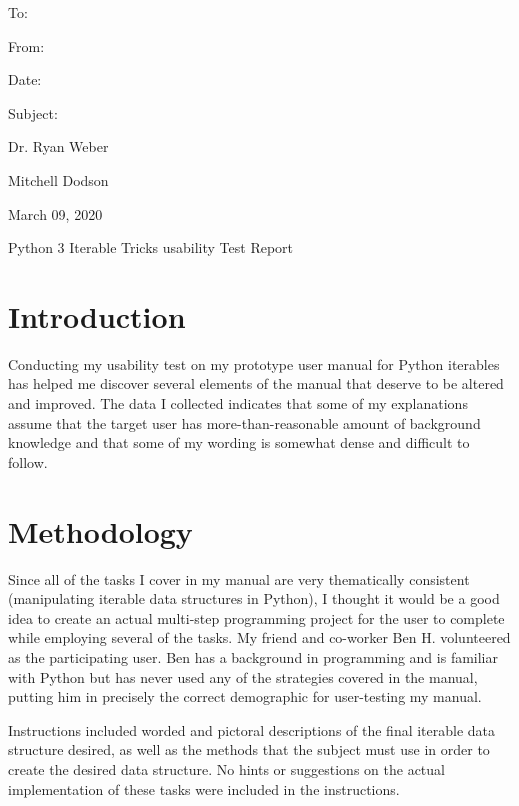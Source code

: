 \documentclass[11pt]{article}
\begin{document}
\begin{minipage}[h]{.1\textwidth}
	To:

	From:

	Date:

	Subject:
\end{minipage}
\begin{minipage}[h]{.8\textwidth}

	Dr. Ryan Weber

	Mitchell Dodson

	March 09, 2020

	Python 3 Iterable Tricks usability Test Report
\end{minipage}

\section{Introduction}

Conducting my usability test on my prototype user manual for Python iterables has helped me discover several elements of the manual that deserve to be altered and improved. The data I collected indicates that some of my explanations assume that the target user has more-than-reasonable amount of background knowledge and that some of my wording is somewhat dense and difficult to follow.

\section{Methodology}

Since all of the tasks I cover in my manual are very thematically consistent (manipulating iterable data structures in Python), I thought it would be a good idea to create an actual multi-step programming project for the user to complete while employing several of the tasks. My friend and co-worker Ben H. volunteered as the participating user. Ben has a background in programming and is familiar with Python but has never used any of the strategies covered in the manual, putting him in precisely the correct demographic for user-testing my manual.

Instructions included worded and pictoral descriptions of the final iterable data structure desired, as well as the methods that the subject must use in order to create the desired data structure. No hints or suggestions on the actual implementation of these tasks were included in the instructions.
\end{document}
